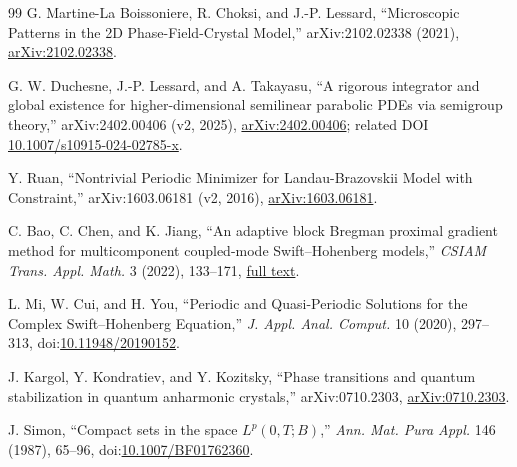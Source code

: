 \documentclass[11pt]{article}
\numberwithin{equation}{section}
\theoremstyle{definition}
\begin{document}
{\begin{thebibliography}{99}
G. Martine-La Boissoniere, R. Choksi, and J.-P. Lessard, ``Microscopic
Patterns in the 2D Phase-Field-Crystal Model,'' arXiv:2102.02338 (2021),
\href{https://arxiv.org/abs/2102.02338}{arXiv:2102.02338}.

G. W. Duchesne, J.-P. Lessard, and A. Takayasu, ``A rigorous integrator and
global existence for higher-dimensional semilinear parabolic PDEs via
semigroup theory,'' arXiv:2402.00406 (v2, 2025),
\href{https://arxiv.org/abs/2402.00406}{arXiv:2402.00406}; related DOI
\href{https://doi.org/10.1007/s10915-024-02785-x}{10.1007/s10915-024-02785-x}.

Y. Ruan, ``Nontrivial Periodic Minimizer for Landau-Brazovskii Model with
Constraint,'' arXiv:1603.06181 (v2, 2016),
\href{https://arxiv.org/abs/1603.06181}{arXiv:1603.06181}.

C. Bao, C. Chen, and K. Jiang, ``An adaptive block Bregman proximal gradient
method for multicomponent coupled-mode Swift--Hohenberg models,''
\emph{CSIAM Trans. Appl. Math.} 3 (2022), 133--171,
\href{https://global-sci.com/index.php/csiam-am/article/download/7797/15528}{full text}.

L. Mi, W. Cui, and H. You, ``Periodic and Quasi-Periodic Solutions for the
Complex Swift--Hohenberg Equation,'' \emph{J. Appl. Anal. Comput.} 10 (2020),
297--313, doi:\href{https://doi.org/10.11948/20190152}{10.11948/20190152}.

J. Kargol, Y. Kondratiev, and Y. Kozitsky, ``Phase transitions and quantum
stabilization in quantum anharmonic crystals,'' arXiv:0710.2303,
\href{https://arxiv.org/abs/0710.2303}{arXiv:0710.2303}.

J. Simon, ``Compact sets in the space $L^p(0,T;B)$,'' \emph{Ann. Mat. Pura
Appl.} 146 (1987), 65--96,
doi:\href{https://doi.org/10.1007/BF01762360}{10.1007/BF01762360}.
\end{thebibliography}
}
\end{document}
